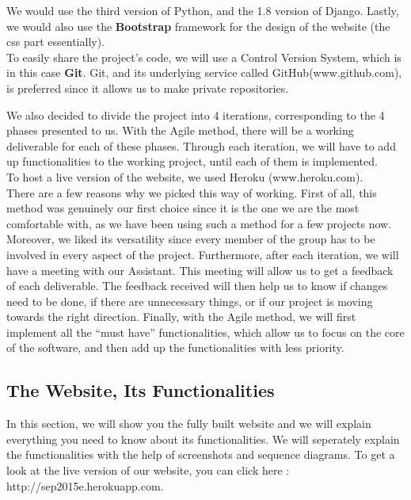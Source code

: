 \documentclass[a4paper, 12pt]{article}
\begin{document}
We would use the third version of Python, and the 1.8 version of Django. Lastly, we would also use the \textbf{Bootstrap} framework for the design of the website (the css part essentially). \\

To easily share the project’s code, we will use a Control Version System, which is in this case \textbf{Git}. Git, and its underlying service called GitHub(www.github.com), is preferred since it allows us to make private repositories. 

We also decided to divide the project into 4 iterations, corresponding to the 4 phases presented to us. With the Agile method, there will be a working deliverable for each of these phases. Through each iteration, we will have to add up functionalities to the working project, until each of them is implemented.  \\

To host a live version of the website, we used Heroku (www.heroku.com).\\

There are a few reasons why we picked this way of working. First of all, this method was genuinely our first choice since it is the one we are the most comfortable with, as we have been using such a method for a few projects now. Moreover, we liked its versatility since every member of the group has to be involved in every aspect of the project. Furthermore, after each iteration, we will have a meeting with our Assistant. This meeting will allow us to get a feedback of each deliverable. The feedback received will then help us to know if changes need to be done, if there are unnecessary things, or if our project is moving towards the right direction. Finally, with the Agile method, we will first implement all the “must have” functionalities, which allow us to focus on the core of the software, and then add up the functionalities with less priority. \\

\subsection{The Website, Its Functionalities}

In this section, we will show you the fully built website and we will explain everything you need to know about its functionalities. We will seperately explain the functionalities with the help of screenshots and sequence diagrams. To get a look at the live version of our website, you can click here : http://sep2015e.herokuapp.com. \\
\end{document}
